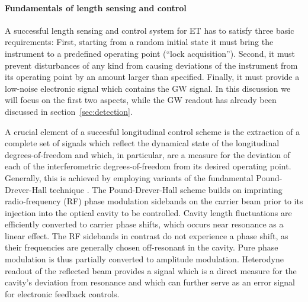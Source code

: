 \paragraph{Fundamentals of length sensing and control}%

A successful length sensing and control system for ET has to satisfy three basic requirements: First, starting from a random 
initial state it must bring the instrument to a predefined operating point (``lock acquisition''). Second, it must prevent disturbances of any
kind from causing deviations of the instrument from its operating point by an amount larger than specified. Finally, it must provide a low-noise electronic signal which contains the GW signal.
In this discussion we will focus on the first two aspects, while the GW readout has already been discussed in section~\ref{sec:detection}.

A crucial element of a succesful longitudinal control scheme is the extraction of a complete set of signals which reflect 
the dynamical state of the longitudinal degrees-of-freedom and which, in particular, are 
a measure for the deviation of each of the interferometric degrees-of-freedom from its desired operating point.
Generally, this is achieved by employing variants of the fundamental Pound-Drever-Hall technique \cite{DHKHF83}.
The Pound-Drever-Hall scheme builds on imprinting radio-frequency (RF) phase modulation sidebands on the carrier beam prior to its injection into
the optical cavity to be controlled. Cavity length fluctuations are efficiently converted to carrier phase shifts, which occurs near resonance as a linear
effect. The RF sidebands in contrast do not experience a phase shift, as their frequencies are generally chosen off-resonant in the cavity. Pure phase 
modulation is thus partially converted to amplitude modulation. Heterodyne readout of the reflected beam provides a signal which is a direct 
measure for the cavity's deviation from resonance and which can further serve as an error signal for electronic feedback controls.

